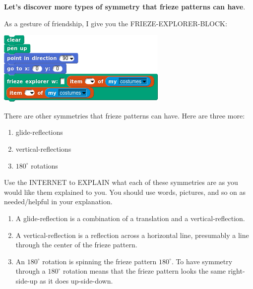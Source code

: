 \documentclass[noauthor,nooutcomes,12pt,hints,handout]{ximera}
\begin{document}
\textbf{Let's discover more types of symmetry that
  frieze patterns can have}.

As a gesture of friendship, I give you the FRIEZE-EXPLORER-BLOCK:
\begin{center}
  \includegraphics{friezeExplorerSCRIPT.png}
\end{center}




\mynewpage



\begin{question}
  There are other symmetries that frieze patterns can have. Here are
  three more:
  \begin{enumerate}
  \item glide-reflections
  \item vertical-reflections
  \item $180^\circ$ rotations
  \end{enumerate}
  Use the INTERNET to EXPLAIN what each of these symmetries are as you
  would like them explained to you. You should use words, pictures,
  and so on as needed/helpful in your explanation.
  \begin{freeResponse}
    \begin{enumerate}
    \item A glide-reflection is a combination of a translation and a
      vertical-reflection.
    \item A vertical-reflection is a reflection across a horizontal
      line, presumably a line through the center of the frieze
      pattern.
    \item An $180^\circ$ rotation is spinning the frieze pattern
      $180^\circ$. To have symmetry through a $180^\circ$ rotation
      means that the frieze pattern looks the same right-side-up as it
      does up-side-down.
    \end{enumerate}
  \end{freeResponse}
\end{question}

\mynewpage
\end{document}
